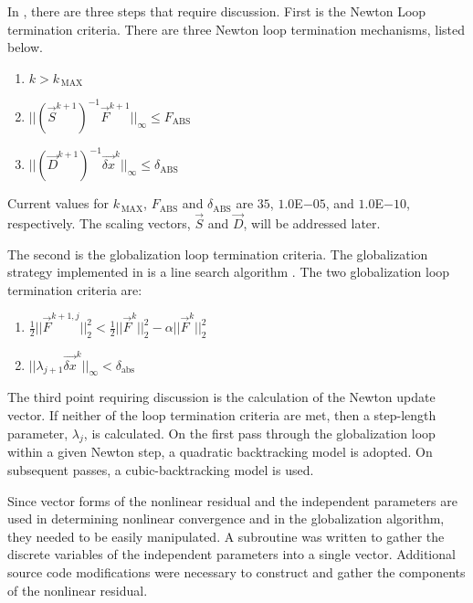 In , there are three steps that require discussion.
First is the Newton Loop termination criteria.
There are three Newton loop termination mechanisms, listed below.

\begin{enumerate}
\item{$k > k_{\,\text{MAX}}$}
\item{$||(\vec{S}^{k+1})^{-1}\vec{F}^{k+1}||_{\infty} \leq F_{\text{ABS}}$}
\item{$||(\vec{D}^{k+1})^{-1}\vec{\delta x}^{k}||_{\infty} \leq \delta_{\text{ABS}}$}
\end{enumerate}

Current values for $k_{\,\text{MAX}}$, $F_{\text{ABS}}$ and $\delta_{\text{ABS}}$ are $35$, $1.0$E$-05$, and $1.0$E$-10$, respectively.
The scaling vectors, $\vec{S}$ and $\vec{D}$, will be addressed later.

The second is the globalization loop termination criteria.
The globalization strategy implemented in \cobra{} is a line search algorithm \cite{Dennis1996}.
The two globalization loop termination criteria are:

\begin{enumerate}
\item{$\frac{1}{2}||\vec{F}^{k+1, j}||^{2}_{2} < \frac{1}{2}||\vec{F}^{k}||^{2}_{2} - \alpha ||\vec{F}^{k}||^{2}_{2}$ }
\item{$||\lambda_{j+1} \vec{\delta x}^{k}||_{\infty} < \delta_{\text{abs}}$}
\end{enumerate}

The third point requiring discussion is the calculation of the Newton update vector.
If neither of the loop termination criteria are met, then a step-length parameter, $\lambda_j$, is calculated.
On the first pass through the globalization loop within a given Newton step, a quadratic backtracking model is adopted.
On subsequent passes, a cubic-backtracking model is used.
 
Since vector forms of the nonlinear residual and the independent parameters are used in determining nonlinear convergence and in the globalization algorithm, they needed to be easily manipulated.
A subroutine was written to gather the discrete variables of the independent parameters into a single vector.
Additional source code modifications were necessary to construct and gather the components of the nonlinear residual.

